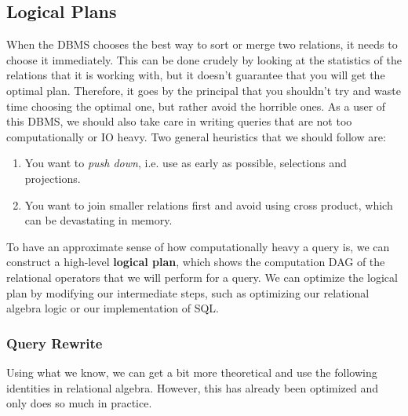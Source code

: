 \subsection{Logical Plans}

    When the DBMS chooses the best way to sort or merge two relations, it needs to choose it immediately. This can be done crudely by looking at the statistics of the relations that it is working with, but it doesn't guarantee that you will get the optimal plan. Therefore, it goes by the principal that you shouldn't try and waste time choosing the optimal one, but rather avoid the horrible ones. As a user of this DBMS, we should also take care in writing queries that are not too computationally or IO heavy. Two general heuristics that we should follow are: 
    \begin{enumerate}
      \item You want to \textit{push down}, i.e. use as early as possible, selections and projections. 
      \item You want to join smaller relations first and avoid using cross product, which can be devastating in memory. 
    \end{enumerate}

    \begin{definition}
      To have an approximate sense of how computationally heavy a query is, we can construct a high-level \textbf{logical plan}, which shows the computation DAG of the relational operators that we will perform for a query. We can optimize the logical plan by modifying our intermediate steps, such as optimizing our relational algebra logic or our implementation of SQL. 
    \end{definition}

  \subsubsection{Query Rewrite}

    Using what we know, we can get a bit more theoretical and use the following identities in relational algebra. However, this has already been optimized and only does so much in practice. 

